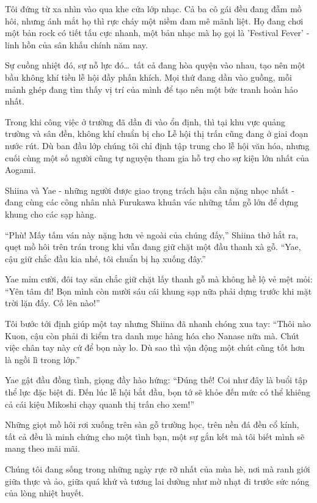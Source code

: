 \documentclass[../main.tex]{subfiles}
\begin{document}
Tôi đứng từ xa nhìn vào qua khe cửa lớp nhạc. Cả ba cô gái đều đang đẫm mồ hôi, nhưng ánh mắt họ thì rực cháy một niềm đam mê mãnh liệt. Họ đang chơi một bản rock có tiết tấu cực nhanh, một bản nhạc mà họ gọi là 'Festival Fever' - linh hồn của sân khấu chính năm nay.

Sự cuồng nhiệt đó, sự nỗ lực đó\dots\ tất cả đang hòa quyện vào nhau, tạo nên một bầu không khí tiền lễ hội đầy phấn khích. Mọi thứ đang dần vào guồng, mỗi mảnh ghép đang tìm thấy vị trí của mình để tạo nên một bức tranh hoàn hảo nhất.

Trong khi công việc ở trường đã dần đi vào ổn định, thì tại khu vực quảng trường và sân đền, không khí chuẩn bị cho Lễ hội thị trấn cũng đang ở giai đoạn nước rút. Dù ban đầu lớp chúng tôi chỉ định tập trung cho lễ hội văn hóa, nhưng cuối cùng một số người cũng tự nguyện tham gia hỗ trợ cho sự kiện lớn nhất của Aogami.

Shiina và Yae - những người được giao trọng trách hậu cần nặng nhọc nhất - đang cùng các công nhân nhà Furukawa khuân vác những tấm gỗ lớn để dựng khung cho các sạp hàng.

``Phù! Mấy tấm ván này nặng hơn vẻ ngoài của chúng đấy,'' Shiina thở hắt ra, quẹt mồ hôi trên trán trong khi vẫn đang giữ chặt một đầu thanh xà gỗ. ``Yae, cậu giữ chắc đầu kia nhé, tôi chuẩn bị hạ xuống đây.''

Yae mỉm cười, đôi tay săn chắc giữ chặt lấy thanh gỗ mà không hề lộ vẻ mệt mỏi: ``Yên tâm đi! Bọn mình còn mười sáu cái khung sạp nữa phải dựng trước khi mặt trời lặn đấy. Cố lên nào!''

Tôi bước tới định giúp một tay nhưng Shiina đã nhanh chóng xua tay: ``Thôi nào Kuon, cậu còn phải đi kiểm tra danh mục hàng hóa cho Nanase nữa mà. Chút việc chân tay này cứ để bọn này lo. Dù sao thì vận động một chút cũng tốt hơn là ngồi lì trong lớp.''

Yae gật đầu đồng tình, giọng đầy hào hứng: ``Đúng thế! Coi như đây là buổi tập thể lực đặc biệt đi. Đến lúc lễ hội bắt đầu, bọn tớ sẽ khỏe đến mức có thể khiêng cả cái kiệu Mikoshi chạy quanh thị trấn cho xem!''

Những giọt mồ hôi rơi xuống trên sàn gỗ trường học, trên nền đá đền cổ kính, tất cả đều là minh chứng cho một tình bạn, một sự gắn kết mà tôi biết mình sẽ mang theo mãi mãi.

Chúng tôi đang sống trong những ngày rực rỡ nhất của mùa hè, nơi mà ranh giới giữa thực và ảo, giữa quá khứ và tương lai dường như mờ nhạt đi trước sức nóng của lòng nhiệt huyết.
\end{document}
